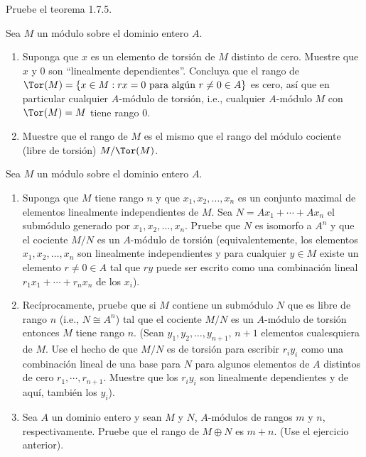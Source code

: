 \begin{ExerciseList}
  \item Pruebe el teorema 1.7.5.
  
  \item Sea $M$ un módulo sobre el dominio entero $A$.
    \begin{enumerate}
      \item Suponga que $x$ es un elemento de torsión de $M$ distinto de cero. Muestre que $x$ y $0$ son ``linealmente dependientes''. Concluya que el rango de $\Tor(M) = \{x \in M : rx = 0 \ \text{para algún}\ r \neq 0 \in A\}$ es cero, así que en particular cualquier $A$-módulo de torsión, i.e., cualquier $A$-módulo $M$ con $\Tor(M) = M$ tiene rango $0$.
      \item Muestre que el rango de $M$ es el mismo que el rango del módulo cociente (libre de torsión) $M/\Tor(M)$.
    \end{enumerate}
    
    \item Sea $M$ un módulo sobre el dominio entero $A$.
    \begin{enumerate}
      \item Suponga que $M$ tiene rango $n$ y que $x_1,x_2,\ldots,x_n$ es un conjunto maximal de elementos linealmente independientes de $M$. Sea $N = Ax_1 + \cdots + Ax_n$ el submódulo generado por $x_1,x_2,\ldots,x_n$. Pruebe que $N$ es isomorfo a $A^n$ y que el cociente $M/N$ es un $A$-módulo de torsión (equivalentemente, los elementos $x_1,x_2,\ldots,x_n$ son linealmente independientes y para cualquier $y \in M$ existe un elemento $r \neq 0 \in A$ tal que $ry$ puede ser escrito como una combinación lineal $r_1x_1 + \cdots + r_nx_n$ de los $x_i$).
      \item Recíprocamente, pruebe que si $M$ contiene un submódulo $N$ que es libre de rango $n$ (i.e., $N \cong A^n$) tal que el cociente $M/N$ es un $A$-módulo de torsión entonces $M$ tiene rango $n$. (Sean $y_1,y_2,\ldots,y_{n+1}$, $n+1$ elementos cualesquiera de $M$. Use el hecho de que $M/N$ es de torsión para escribir $r_iy_i$ como una combinación lineal de una base para $N$ para algunos elementos de $A$ distintos de cero $r_1,\cdots,r_{n+1}$. Muestre que los $r_iy_i$ son linealmente dependientes y de aquí, también los $y_i$).
      \item Sea $A$ un dominio entero y sean $M$ y $N$, $A$-módulos de rangos $m$ y $n$, respectivamente. Pruebe que el rango de $M \oplus N$ es $m+n$. (Use el ejercicio anterior).
    \end{enumerate}
\end{ExerciseList}